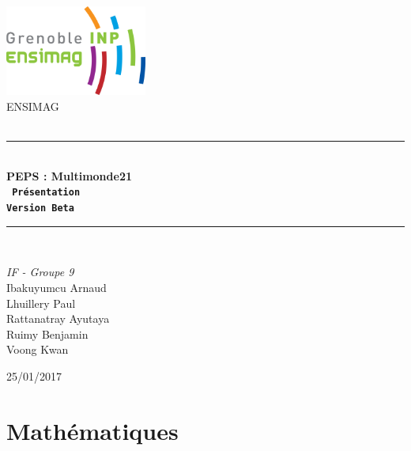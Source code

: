\documentclass[a4paper,12pt]{article}
\newcommand{\HRule}{\rule{\linewidth}{0.5mm}} %
\begin{document}
\begin{titlepage}
\begin{center}

\includegraphics[width=0.35\textwidth]{logo}~\\[2.5cm] %

\textsc{\LARGE ENSIMAG}\\[1.5cm]
\textsc{\Large }\\[0.5cm]

\HRule \\[0.4cm]

{\Huge \bfseries \textsf{PEPS : Multimonde21}\\[0.5cm]
\texttt{ Présentation\\
Version Beta} \\[0.4cm] }

\HRule \\[1.5cm]

\begin{minipage}{0.4\textwidth}
\begin{center} \large
\emph{IF - Groupe 9}\\[2cm]
Ibakuyumcu Arnaud \\
Lhuillery Paul \\
Rattanatray Ayutaya \\
Ruimy Benjamin \\
Voong Kwan
\end{center}
\end{minipage}
\begin{minipage}{0.4\textwidth}
\end{minipage}

\vfill

\large {25/01/2017 }

\end{center}

\end{titlepage}
 \newpage


 \tableofcontents %
 \newpage

\part{Mathématiques}
\end{document}
